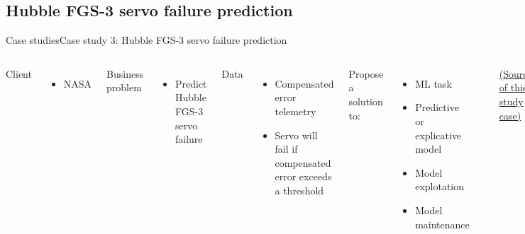 \documentclass[10pt,compress]{beamer} %
\begin{document}
\subsection{Hubble FGS-3 servo failure prediction}
\begin{frame}{Case studies}{Case study 3: Hubble FGS-3 servo failure prediction}
    \begin{columns}
	   \small{
		Client
		\begin{itemize}
			\item NASA
		\end{itemize}
		Business problem
		\begin{itemize}
			\item Predict Hubble FGS-3 servo failure
		\end{itemize}
		Data
		\begin{itemize}
			\item Compensated error telemetry 
			\item Servo will fail if compensated error exceeds a threshold
		\end{itemize}
		Propose a solution to:
		\begin{itemize}
			\item ML task
			\item Predictive or explicative model
			\item Model explotation
			\item Model maintenance
		\end{itemize}
		}
			\includegraphics[width=\linewidth]{figs/hubble.png}

			\tiny \centering \href{https://ti.arc.nasa.gov/m/groups/machinelearningworkshop2017/MLW2017_slides/presentationsPDF/Hamed-Valizadegan.pdf}{(Source of this study case)}
    \end{columns}
\end{frame}
\end{document}

